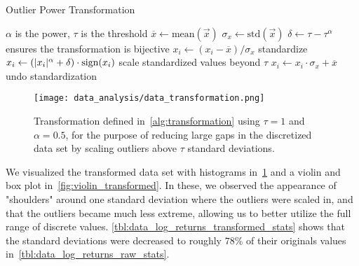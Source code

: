 \begin{algorithm}
\caption{Outlier Power Transformation}
\begin{algorithmic}[1]
            \Comment $\alpha$ is the power, $\tau$ is the threshold
        \State $\overline{x} \gets \text{mean}(\vec{x})$
        \State $\sigma_{x} \gets \text{std}(\vec{x})$
        \State $\delta \gets \tau - \tau^\alpha$
            \Comment ensures the transformation is bijective
            \State $x_i \gets (x_i - \overline{x}) / \sigma_x$
                \Comment standardize
                \State $x_i \gets (\lvert x_i\rvert^\alpha + \delta) \cdot \text{sign}(x_i)$
                    \Comment scale standardized values beyond $\tau$
            \EndIf
            \State $x_i \gets x_i \cdot \sigma_x + \overline{x}$
                \Comment undo standardization
        \EndFor
    \EndProcedure
\end{algorithmic}
\label{alg:transformation}
\end{algorithm}

\begin{figure}[!htb]
    \begin{center}
        \texttt{[image: data\_analysis/data\_transformation.png]}
    \end{center}
    \caption{Transformation defined in~\cref{alg:transformation} using \( \tau = 1 \) and \( \alpha = 0.5 \), for the purpose of reducing large gaps in the discretized data set by scaling outliers above \( \tau \) standard deviations.}
    \label{fig:data_transformation}
\end{figure}

We visualized the transformed data set with histograms in~\cref{fig:data_transformation} and a violin and box plot in~\cref{fig:violin_transformed}.
In these, we observed the appearance of "shoulders" around one standard deviation where the outliers were scaled in, and that the outliers became much less extreme, allowing us to better utilize the full range of discrete values.
\cref{tbl:data_log_returns_transformed_stats} shows that the standard deviations were decreased to roughly \( 78\% \) of their originals values in~\cref{tbl:data_log_returns_raw_stats}.

